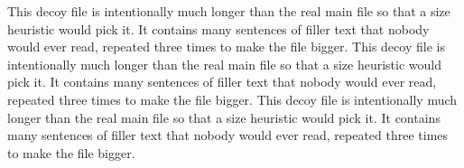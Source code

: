 \documentclass{article}
\begin{document}
This decoy file is intentionally much longer than the real main file so that a
size heuristic would pick it. It contains many sentences of filler text that
nobody would ever read, repeated three times to make the file bigger.
This decoy file is intentionally much longer than the real main file so that a
size heuristic would pick it. It contains many sentences of filler text that
nobody would ever read, repeated three times to make the file bigger.
This decoy file is intentionally much longer than the real main file so that a
size heuristic would pick it. It contains many sentences of filler text that
nobody would ever read, repeated three times to make the file bigger.
\end{document}
